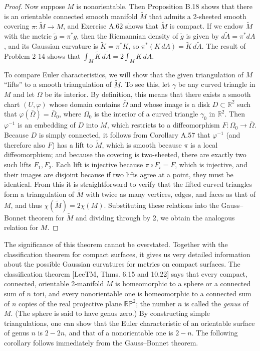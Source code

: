 \begin{proof}
Now suppose $M$ is nonorientable. Then Proposition B.18 shows that there is an orientable connected smooth manifold $\tilde{M}$ that admits a 2-sheeted smooth covering $\pi : \tilde{M} \to M$, and Exercise A.62 shows that $\tilde{M}$ is compact. If we endow $\tilde{M}$ with the metric $\tilde{g} = \pi^* g$, then the Riemannian density of $\tilde{g}$ is given by $d\tilde{A} = \pi^* dA$, and its Gaussian curvature is $\tilde{K} = \pi^* K$, so $\pi^*(K\, dA) = \tilde{K}\, d\tilde{A}$. The result of Problem 2-14 shows that $\int_{\tilde{M}} \tilde{K}\, d\tilde{A} = 2 \int_M K\, dA$.

To compare Euler characteristics, we will show that the given triangulation of $M$ ``lifts'' to a smooth triangulation of $\tilde{M}$. To see this, let $\gamma$ be any curved triangle in $M$ and let $\Omega$ be its interior. By definition, this means that there exists a smooth chart $(U, \varphi)$ whose domain contains $\bar{\Omega}$ and whose image is a disk $D \subset \mathbb{R}^2$ such that $\varphi(\bar{\Omega}) = \bar{\Omega}_0$, where $\Omega_0$ is the interior of a curved triangle $\gamma_0$ in $\mathbb{R}^2$. Then $\varphi^{-1}$ is an embedding of $D$ into $M$, which restricts to a diffeomorphism $F: \Omega_0 \to \bar{\Omega}$. Because $D$ is simply connected, it follows from Corollary A.57 that $\varphi^{-1}$ (and therefore also $F$) has a lift to $\tilde{M}$, which is smooth because $\pi$ is a local diffeomorphism; and because the covering is two-sheeted, there are exactly two such lifts $F_1, F_2$. Each lift is injective because $\pi \circ F_i = F$, which is injective, and their images are disjoint because if two lifts agree at a point, they must be identical. From this it is straightforward to verify that the lifted curved triangles form a triangulation of $\tilde{M}$ with twice as many vertices, edges, and faces as that of $M$, and thus $\chi(\tilde{M}) = 2\chi(M)$. Substituting these relations into the Gauss--Bonnet theorem for $\tilde{M}$ and dividing through by 2, we obtain the analogous relation for $M$.
\end{proof}

The significance of this theorem cannot be overstated. Together with the classification theorem for compact surfaces, it gives us very detailed information about the possible Gaussian curvatures for metrics on compact surfaces. The classification theorem [LeeTM, Thms. 6.15 and 10.22] says that every compact, connected, orientable 2-manifold $M$ is homeomorphic to a sphere or a connected sum of $n$ tori, and every nonorientable one is homeomorphic to a connected sum of $n$ copies of the real projective plane $\mathbb{RP}^2$; the number $n$ is called the \emph{genus} of $M$. (The sphere is said to have genus zero.) By constructing simple triangulations, one can show that the Euler characteristic of an orientable surface of genus $n$ is $2-2n$, and that of a nonorientable one is $2-n$. The following corollary follows immediately from the Gauss--Bonnet theorem.

